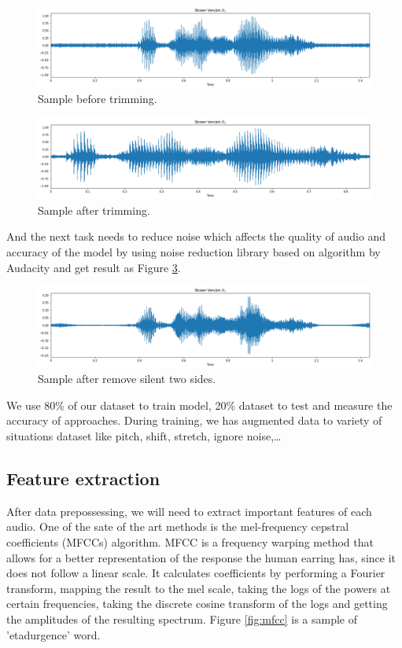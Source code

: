 \documentclass[%
  article,%
  10pt,%
  a4paper,%
  fleqn,%
  oneside,%
  sumario = tradicional,%
  chapter = TITLE,%
  section = TITLE,%
]{abntex2}
\begin{document}
\begin{figure}[H]
  \centering
  \includegraphics[width = 0.8\columnwidth]{./Figuras/sample_1}
   \caption{Sample before trimming.}
  \label{fig:sample_1}
\end{figure}

\begin{figure}[H]
  \centering
   \includegraphics[width = 0.8\columnwidth]{./Figuras/sample_2}
    \caption{Sample after trimming.}
  \label{fig:sample_2}
\end{figure}

And the next task needs to reduce noise which affects the quality of audio and accuracy of the model by using noise reduction library based on algorithm by Audacity and get result as Figure \ref{fig:sample_3}.
\begin{figure}[H]
  \centering
   \includegraphics[width = 0.8\columnwidth]{./Figuras/sample_3}
    \caption{Sample after remove silent two sides.}
  \label{fig:sample_3}
\end{figure}

We use 80\% of our dataset to train model, 20\% dataset to test and measure the accuracy of approaches. During training, we has augmented data to variety of situations dataset like pitch, shift, stretch, ignore noise,\dots

\subsection{Feature extraction}

After data prepossessing, we will need to extract important features of each audio. One of the sate of the art methods is the mel-frequency cepstral coefficients (MFCCs) algorithm. MFCC is a frequency warping method that allows for a better representation of the response the human earring has, since it does not follow a linear scale. It calculates coefficients by performing a Fourier transform, mapping the result to the mel scale, taking the logs of the powers at certain frequencies, taking the discrete cosine transform of the logs and getting the amplitudes of the resulting spectrum. Figure \ref{fig:mfcc} is a sample of 'etadurgence' word. 
\end{document}

